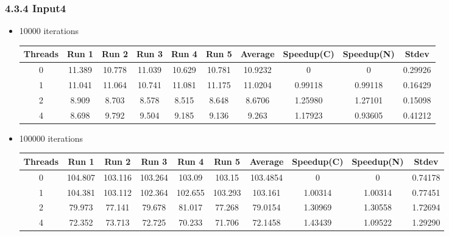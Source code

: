 \documentclass{article}
\begin{document}
\subsubsection*{4.3.4 Input4} 
 \begin{itemize}
\item 10000 iterations
\begin{center}
 \begin{adjustbox}{width=\columnwidth, center} 
 \begin{tabular}{ | |c | c c c c c | c | c c | c | |} \hline 
 Threads & Run 1 & Run 2 & Run 3 & Run 4 & Run 5 & Average & Speedup(C) & Speedup(N) & Stdev \\ [0.5ex] 
 \hline 
 \hline 
0& 11.389 & 10.778 & 11.039 & 10.629 & 10.781 & 10.9232 & 0 & 0 & 0.29926\\ 
 \hline
1& 11.041 & 11.064 & 10.741 & 11.081 & 11.175 & 11.0204 & 0.99118 & 0.99118 & 0.16429\\ 
 \hline
2& 8.909 & 8.703 & 8.578 & 8.515 & 8.648 & 8.6706 & 1.25980 & 1.27101 & 0.15098\\ 
 \hline
4& 8.698 & 9.792 & 9.504 & 9.185 & 9.136 & 9.263 & 1.17923 & 0.93605 & 0.41212\\ 
 \hline
\end{tabular} 
 \end{adjustbox} 
 \end{center} 
\item 100000 iterations
\begin{center}
 \begin{adjustbox}{width=\columnwidth, center} 
 \begin{tabular}{ | |c | c c c c c | c | c c | c | |} \hline 
 Threads & Run 1 & Run 2 & Run 3 & Run 4 & Run 5 & Average & Speedup(C) & Speedup(N) & Stdev \\ [0.5ex] 
 \hline 
 \hline 
0& 104.807 & 103.116 & 103.264 & 103.09 & 103.15 & 103.4854 & 0 & 0 & 0.74178\\ 
 \hline
1& 104.381 & 103.112 & 102.364 & 102.655 & 103.293 & 103.161 & 1.00314 & 1.00314 & 0.77451\\ 
 \hline
2& 79.973 & 77.141 & 79.678 & 81.017 & 77.268 & 79.0154 & 1.30969 & 1.30558 & 1.72694\\ 
 \hline
4& 72.352 & 73.713 & 72.725 & 70.233 & 71.706 & 72.1458 & 1.43439 & 1.09522 & 1.29290\\ 
 \hline
\end{tabular} 
 \end{adjustbox} 
 \end{center} 
\end{itemize}
\end{document}
